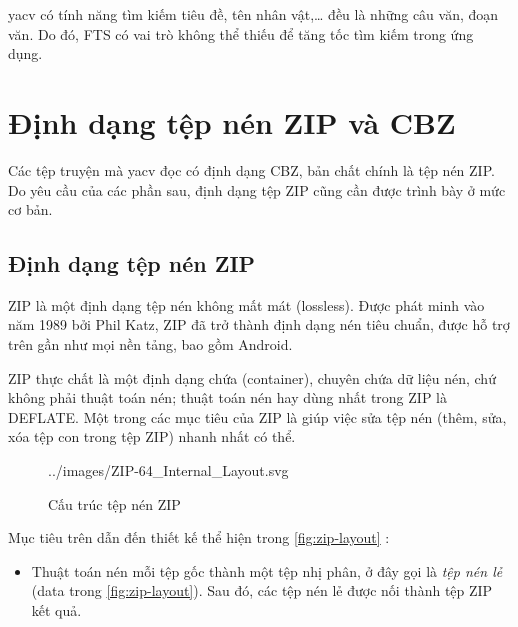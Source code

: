 \documentclass[../../thesis]{subfiles}
\begin{document}
yacv có tính năng tìm kiếm tiêu đề, tên nhân vật,\ldots{} đều là những câu văn,
đoạn văn. Do đó, FTS có vai trò không thể thiếu để tăng tốc tìm kiếm trong ứng
dụng.



\section{Định dạng tệp nén ZIP và CBZ}\label{sec:zip-cbz}

Các tệp truyện mà yacv đọc có định dạng CBZ, bản chất chính là tệp nén ZIP. Do
yêu cầu của các phần sau, định dạng tệp ZIP cũng cần được trình bày ở mức cơ
bản.

\subsection{Định dạng tệp nén ZIP}\label{sec:zip}

ZIP là một định dạng tệp nén không mất mát (lossless). Được phát minh vào năm
1989 bởi Phil Katz, ZIP đã trở thành định dạng nén tiêu chuẩn, được hỗ trợ trên
gần như mọi nền tảng, bao gồm Android.

ZIP thực chất là một định dạng chứa (container), chuyên chứa dữ liệu nén, chứ
không phải thuật toán nén; thuật toán nén hay dùng nhất trong ZIP là DEFLATE.
Một trong các mục tiêu của ZIP là giúp việc sửa tệp nén (thêm, sửa, xóa tệp con
trong tệp ZIP) nhanh nhất có thể.

\begin{figure}
    \centering
    \vspace*{-6mm}
    
        {../images/ZIP-64_Internal_Layout.svg}
    \caption{Cấu trúc tệp nén ZIP \cite{WIKI_ZIP}}
    \label{fig:zip-layout}
\end{figure}

Mục tiêu trên dẫn đến thiết kế thể hiện trong \autoref{fig:zip-layout}
\cite{PKWARE_APPNOTE}:

\begin{itemize}
    \item
        Thuật toán nén mỗi tệp gốc thành một tệp nhị phân, ở đây gọi là
        \emph{tệp nén lẻ} (data trong \autoref{fig:zip-layout}). Sau đó, các tệp
        nén lẻ được nối thành tệp ZIP kết quả.
\end{itemize}
\end{document}
